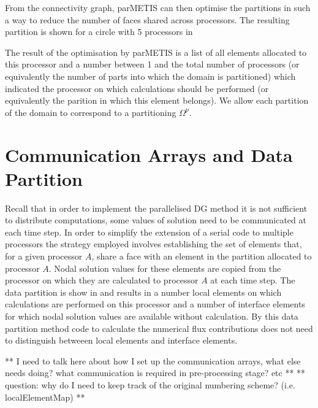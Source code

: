 From the connectivity graph, parMETIS can then optimise the partitions in such a way to reduce the number of faces shared across processors. The resulting partition is shown for a circle with 5 processors in 

The result of the optimisation by parMETIS is a list of all elements allocated to this processor and a number between 1 and the total number of processors (or equivalently the number of parts into which the domain is partitioned) which indicated the processor on which calculations should be performed (or equivalently the parition in which this element belongs). We allow each partition of the domain to correspond to a partitioning $\Omega^p$.

\section{Communication Arrays and Data Partition}

Recall that in order to implement the parallelised DG method it is not sufficient to distribute computations, some values of solution need to be communicated at each time step. In order to simplify the extension of a serial code to multiple processors the strategy employed involves establishing the set of elements that, for a given processor $A$, share a face with an element in the partition allocated to processor $A$. Nodal solution values for these elements are copied from the processor on which they are calculated to processor $A$ at each time step. The data partition is show in  and results in a number local elements on which calculations are performed on this processor and a number of interface elements for which nodal solution values are available without calculation. By this data partition method code to calculate the numerical flux contributions does not need to distinguish betweeen local elements and interface elements.

** I need to talk here about how I set up the communication arrays, what else needs doing? what communication is required in pre-processing stage? etc **
** question: why do I need to keep track of the original numbering scheme? (i.e. localElementMap) **

